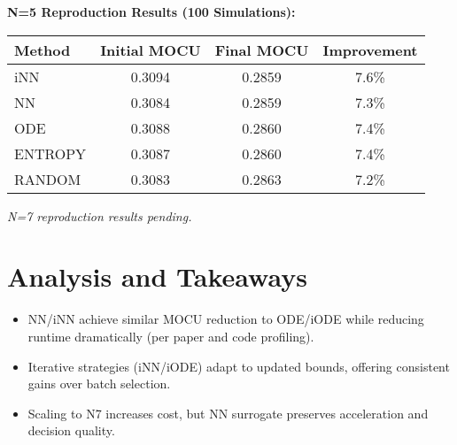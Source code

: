 \documentclass[11pt]{article}
\begin{document}
\textbf{N=5 Reproduction Results (100 Simulations):}

\begin{center}
\begin{tabular}{lccc}
\toprule
\textbf{Method} & \textbf{Initial MOCU} & \textbf{Final MOCU} & \textbf{Improvement} \\
\midrule
 iNN & 0.3094 & 0.2859 & 7.6\% \\
 NN & 0.3084 & 0.2859 & 7.3\% \\
 ODE & 0.3088 & 0.2860 & 7.4\% \\
 ENTROPY & 0.3087 & 0.2860 & 7.4\% \\
 RANDOM & 0.3083 & 0.2863 & 7.2\% \\
\bottomrule
\end{tabular}
\end{center}

\textit{N=7 reproduction results pending.}

\newpage\section*{Analysis and Takeaways}
\begin{itemize}
\item NN/iNN achieve similar MOCU reduction to ODE/iODE while reducing runtime dramatically (per paper and code profiling).
\item Iterative strategies (iNN/iODE) adapt to updated bounds, offering consistent gains over batch selection.
\item Scaling to N7 increases cost, but NN surrogate preserves acceleration and decision quality.
\end{itemize}
\end{document}
